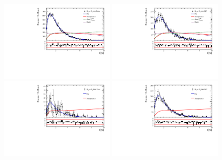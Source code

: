 \begin{figure}[h]
\caption{}
\label{fig:}
\includegraphics[height=!,width=0.49\textwidth]{figs/Acceptance/adaptive_N4/timeAccRatioFit_norm_Run1_t1.pdf}
\includegraphics[height=!,width=0.49\textwidth]{figs/Acceptance/adaptive_N4/timeAccRatioFit_norm_mc_Run1_t1.pdf}
\includegraphics[height=!,width=0.49\textwidth]{figs/Acceptance/adaptive_N4/timeAccRatioFit_signal_B0_Run1_t1.pdf}
\includegraphics[height=!,width=0.49\textwidth]{figs/Acceptance/adaptive_N4/timeAccRatioFit_signal_mc_Run1_t1.pdf}
\caption{}
\label{fig:}
\end{figure}

\clearpage

